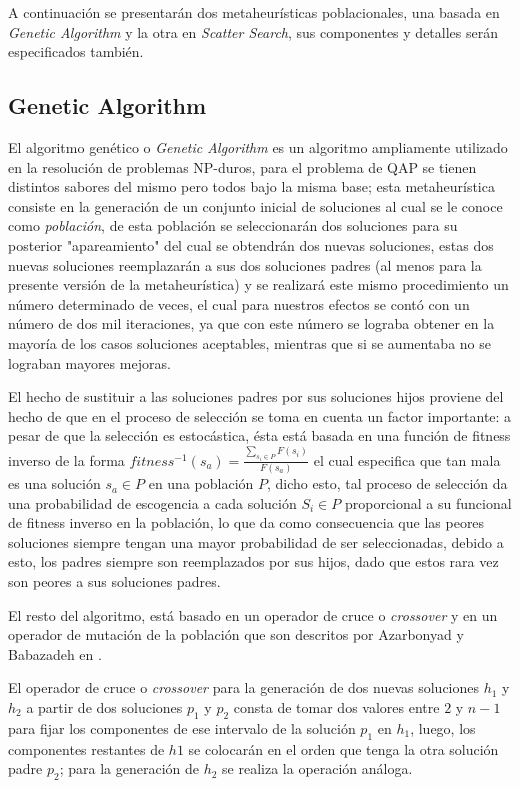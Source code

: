 \documentclass{ci5652}
\begin{document}
A continuación se presentarán dos metaheurísticas poblacionales, una basada en \textit{Genetic Algorithm} y la otra en \textit{Scatter Search}, sus componentes y detalles serán especificados también.

\subsection{Genetic Algorithm}

El algoritmo genético o \textit{Genetic Algorithm} es un algoritmo ampliamente utilizado en la resolución de problemas NP-duros, para el problema de QAP se tienen distintos sabores del mismo pero todos bajo la misma base; esta metaheurística consiste en la generación de un conjunto inicial de soluciones al cual se le conoce como \textit{población}, de esta población se seleccionarán dos soluciones para su posterior "apareamiento" del cual se obtendrán dos nuevas soluciones, estas dos nuevas soluciones reemplazarán a sus dos soluciones padres (al menos para la presente versión de la metaheurística) y se realizará este mismo procedimiento un número determinado de veces, el cual para nuestros efectos se contó con un número de dos mil iteraciones, ya que con este número se lograba obtener en la mayoría de los casos soluciones aceptables, mientras que si se aumentaba no se lograban mayores mejoras.

El hecho de sustituir a las soluciones padres por sus soluciones hijos proviene del hecho de que en el proceso de selección se toma en cuenta un factor importante: a pesar de que la selección es estocástica, ésta está basada en una función de fitness inverso de la forma \(fitness^{-1}(s_{a}) =  \frac{\sum_{s_{i} \in P} F(s_{i})}{F(s_{a})}\) el cual especifica que tan mala es una solución \(s_{a} \in P\) en una población \(P\), dicho esto, tal proceso de selección da una probabilidad de escogencia a cada solución \(S_{i} \in P\) proporcional a su funcional de fitness inverso en la población, lo que da como consecuencia que las peores soluciones siempre tengan una mayor probabilidad de ser seleccionadas, debido a esto, los padres siempre son reemplazados por sus hijos, dado que estos rara vez son peores a sus soluciones padres.

El resto del algoritmo, está basado en un operador de cruce o \textit{crossover} y en un operador de mutación de la población que son descritos por Azarbonyad y Babazadeh en \cite{azar}. 

El operador de cruce o \textit{crossover} para la generación de dos nuevas soluciones \(h_{1}\) y \(h_{2}\) a partir de dos soluciones \(p_{1}\) y \(p_{2}\) consta de tomar dos valores entre \(2\) y \(n - 1\) para fijar los componentes de ese intervalo de la solución \(p_{1}\) en \(h_{1}\), luego, los componentes restantes de \(h1\) se colocarán en el orden que tenga la otra solución padre \(p_{2}\); para la generación de \(h_{2}\) se realiza la operación análoga.
\end{document}

